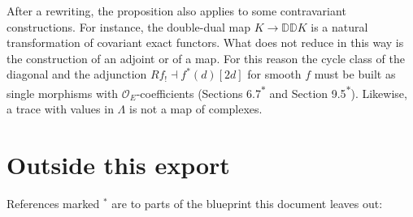 \documentclass[11pt]{article}
\newcommand{\bpout}[1]{#1\textsuperscript{\hyperlink{bp-outside}{\ensuremath{\ast}}}}
\begin{document}
\label{bp36}%
After a rewriting, the proposition also applies to some contravariant constructions. For instance, the double-dual map \(K\to\mathbb D\mathbb DK\) is a natural transformation of covariant exact functors. What does not reduce in this way is the construction of an adjoint or of a map. For this reason the cycle class of the diagonal and the adjunction \(Rf_!\dashv f^*(d)[2d]\) for smooth \(f\) must be built as single morphisms with \(\mathcal O_E\)-coefficients (Sections \bpout{6.7} and \bpout{Section 9.5}). Likewise, a trace with values in \(\Lambda\) is not a map of complexes.



\clearpage{}\hypertarget{bp-outside}{}%
\section*{Outside this export}
References marked \ensuremath{{}^\ast} are to parts of the blueprint this document leaves out:
\end{document}
